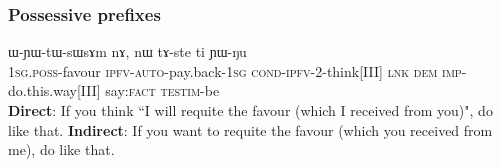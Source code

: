 \documentclass[xcolor=table]{beamer}
\newcommand{\rouge}[1]{{\color{red}#1}}
\newcommand{\bleu}[1]{{\color{blue}#1}}
\newcommand{\ipa}[1]{{\phon #1}} %
\begin{document}
 
     \begin{frame} 
        \frametitle{Possessive prefixes}
\begin{exe}
\ex
\gll   \rouge{\ipa{a-tʂɯnlɤn}}  	\bleu{\ipa{ɲɯ-nɯ-fsɯɣ-a}}  	\ipa{ɯ-ɲɯ-tɯ-sɯsɤm}  	\ipa{nɤ,}  	\ipa{nɯ}  	\ipa{tɤ-ste}  	\ipa{ti}  \ipa{ɲɯ-ŋu} \\
 \rouge{\textsc{1sg.poss}-favour} \bleu{\textsc{ipfv-auto}-pay.back-\textsc{1sg}} \textsc{cond-ipfv}-2-think[III] \textsc{lnk} \textsc{dem} \textsc{imp}-do.this.way[III] say:\textsc{fact} \textsc{testim}-be \\
 \glt    \textbf{Direct}: If you think ``\bleu{I will requite} the \rouge{favour} (which I received from \rouge{you})", do like that.
\glt    \textbf{Indirect}: If you want to requite the \rouge{favour} (which you received from \rouge{me}), do like that.
  \end{exe}
 \end{frame} 
 
 
 
 
 
  \begin{frame} 

 

 
 \end{frame} 
\end{document}
